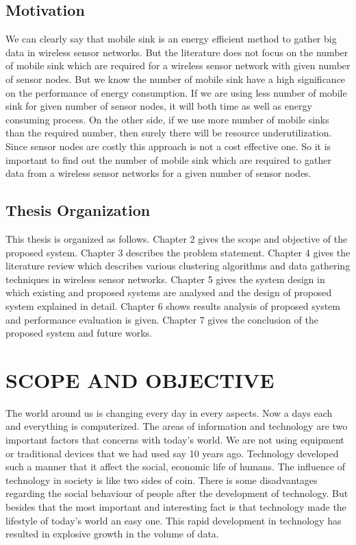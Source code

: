 \documentclass[MTech]{iitmdiss}
\begin{document}
\section{Motivation}
We can clearly say that mobile sink is an energy efficient method to gather big data in wireless sensor networks. But the literature does not focus on the number of mobile sink which are required for a wireless sensor network with given number of sensor nodes. But we know the number of mobile sink have a high significance on the performance of energy consumption. If we are using less number of mobile sink for given number of sensor nodes, it will both time as well as energy consuming process. On the other side, if we use more number of mobile sinks than the required number, then surely there will be resource underutilization. Since sensor nodes are costly this approach is not a cost effective one. So it is important to find out the number of mobile sink which are required to gather data from a wireless sensor networks for a given number of sensor nodes.
\section{Thesis Organization}
This thesis is organized as follows. Chapter 2 gives the scope and objective of the proposed system. Chapter 3 describes the problem statement. Chapter 4 gives the literature review which describes various clustering algorithms and data gathering techniques in wireless sensor networks. Chapter 5 gives the system design  in which existing and proposed systems are analysed and the design of proposed system explained in detail. Chapter 6 shows results analysis of proposed system and performance evaluation is given. Chapter 7
gives the conclusion of the proposed system and future works.

\clearpage
\pagebreak
\chapter{SCOPE AND OBJECTIVE}
\label{chap:scope}
The world around us is changing every day in every aspects. Now a days each and everything is computerized. The areas of information and technology are two important factors that concerns with today's world. We are not using equipment or traditional devices that we had used say 10 years ago. Technology developed such a manner that it affect the social, economic life of humans. The influence of technology in society is like two sides of coin. There is some disadvantages regarding the social behaviour of people after the development of technology. But besides that the most important  and interesting fact is that technology made the lifestyle of today's world an easy one. This rapid development in technology has resulted in explosive growth in the  volume of data.
\end{document}
